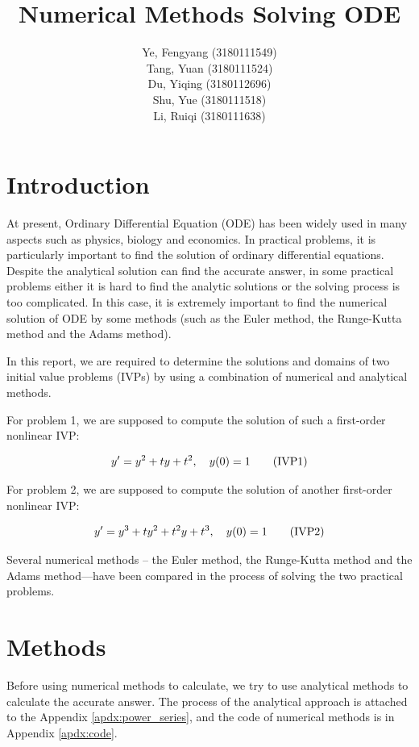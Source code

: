 \documentclass[a4paper]{article}
\title{\textbf{Numerical Methods Solving ODE}}
\author{
	Ye, Fengyang (3180111549) \\
	Tang, Yuan (3180111524)   \\
	Du, Yiqing (3180112696)   \\
	Shu, Yue (3180111518)     \\
	Li, Ruiqi (3180111638)
}
\begin{document}
    \maketitle

    \section{Introduction}
    
    At present, Ordinary Differential Equation (ODE) has been widely used in many aspects such as physics, biology and economics. In practical problems, it is particularly important to find the solution of ordinary differential equations. Despite the analytical solution can find the accurate answer, in some practical problems either it is hard to find the analytic solutions or the solving process is too complicated. In this case, it is extremely important to find the numerical solution of ODE by some methods (such as the Euler method, the Runge-Kutta method and the Adams method). 
    
    In this report, we are required to determine the solutions and domains of two initial value problems (IVPs) by using a combination of numerical and analytical methods. 
    
    For problem 1, we are supposed to compute the solution of such a first-order nonlinear IVP: 
	
	\begin{equation} \label{eq:ode1}
	    y' = y^2 + ty + t^2,\quad y(0) = 1 \\ \tag{IVP1}
	\end{equation}
	
	For problem 2, we are supposed to compute the solution of another first-order nonlinear IVP: 
	
	\begin{equation} \label{eq:ode2}
	    y' = y^3 + ty^2 + t^2y + t^3,\quad y(0) = 1 \\ \tag{IVP2}
	\end{equation}
	
	Several numerical methods -- the Euler method, the Runge-Kutta method and the Adams method—have been compared in the process of solving the two practical problems.
	
    \section{Methods}
    Before using numerical methods to calculate, we try to use analytical methods to calculate the accurate answer. The process of the analytical approach is attached to the Appendix \autoref{apdx:power_series}, and the code of numerical methods is in Appendix \autoref{apdx:code}.
\end{document}
